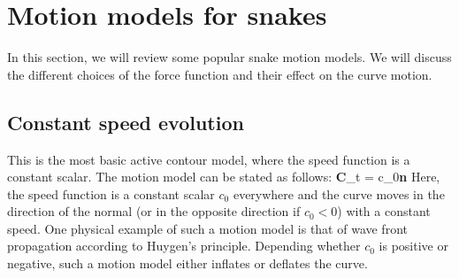 \section{Motion models for snakes} 

In this section, we will review some popular snake motion models. We will discuss the different choices of  the force function and their effect on the curve motion.
\subsection{Constant speed evolution}
This is the most basic active contour model, where the speed function is a constant scalar. The motion model can be stated as follows:
\bea
\textbf{C}_t = c_0\;\textbf{n}
\label{eq:const_speed}
\eea
Here, the speed function is a constant scalar $c_0$ everywhere and the curve moves in the direction of the normal (or in the opposite direction if $c_0<0$) with a constant speed. One physical example of such a motion model is that of wave front propagation according to Huygen's principle. Depending whether $c_0$ is positive or negative, such a motion model either inflates or deflates the curve. 

